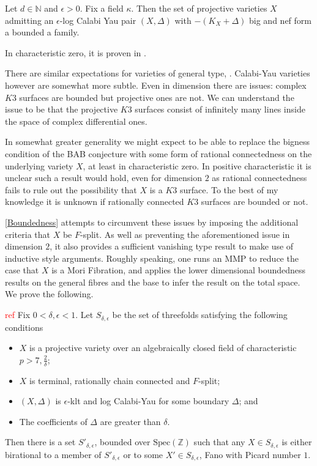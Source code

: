 \documentclass[a4paper,12pt]{book}
\newcommand\myworries[1]{\textcolor{red}{#1}}
\begin{document}
	\begin{conjecture*}
		Let $d \in \mathbb{N}$ and $\epsilon > 0$. Fix a field $\kappa$. Then the set of projective varieties $X$ admitting an $\epsilon$-log Calabi Yau pair $(X,\Delta)$ with $-(K_{X}+\Delta)$ big and nef form a bounded a family.
		\end{conjecture*}	
	
	In characteristic zero, it is proven in \cite{}.
	
	There are similar expectations for varieties of general type, \cite{}. Calabi-Yau varieties however are somewhat more subtle. Even in dimension there are issues: complex $K3$ surfaces are bounded but projective ones are not. We can understand the issue to be that the projective $K3$ surfaces consist of infinitely many lines inside the space of complex differential ones.
	
	In somewhat greater generality we might expect to be able to replace the bigness condition of the BAB conjecture with some form of rational connectedness on the underlying variety $X$, at least in characteristic zero. In positive characteristic it is unclear such a result would hold, even for dimension $2$ as rational connectedness fails to rule out the possibility that $X$ is a $K3$ surface. To the best of my knowledge it is unknown if rationally connected $K3$ surfaces are bounded or not.
	
	\autoref{Boundedness} attempts to circumvent these issues by imposing the additional criteria that $X$ be $F$-split. As well as preventing the aforementioned issue in dimension $2$, it also provides a sufficient vanishing type result to make use of inductive style arguments. Roughly speaking, one runs an MMP to reduce the case that $X$ is a Mori Fibration, and applies the lower dimensional boundedness results on the general fibres and the base to infer the result on the total space. We prove the following.
	
	\begin{theo}\label{Main_Bound}\myworries{ref}
		Fix $0 < \delta, \epsilon <1$. Let $S_{\delta,\epsilon}$ be the set of threefolds satisfying the following conditions
		\begin{itemize}
			\item $X$ is a projective variety over an algebraically closed field of characteristic $p >7, \frac{2}{\delta}$;
			\item $X$ is terminal, rationally chain connected and $F$-split;
			\item $(X,\Delta)$ is $\epsilon$-klt and log Calabi-Yau for some boundary $\Delta$; and
			\item The coefficients of $\Delta$ are greater than $\delta$.
		\end{itemize}
		
		Then there is a set $S'_{\delta,\epsilon}$, bounded over $\text{Spec}(\mathbb{Z})$ such that any $X\in S_{\delta,\epsilon}$ is either birational to a member of $S'_{\delta,\epsilon}$ or to some $X'\in S_{\delta,\epsilon}$, Fano with Picard number $1$. 
	\end{theo}
	
\end{document}
